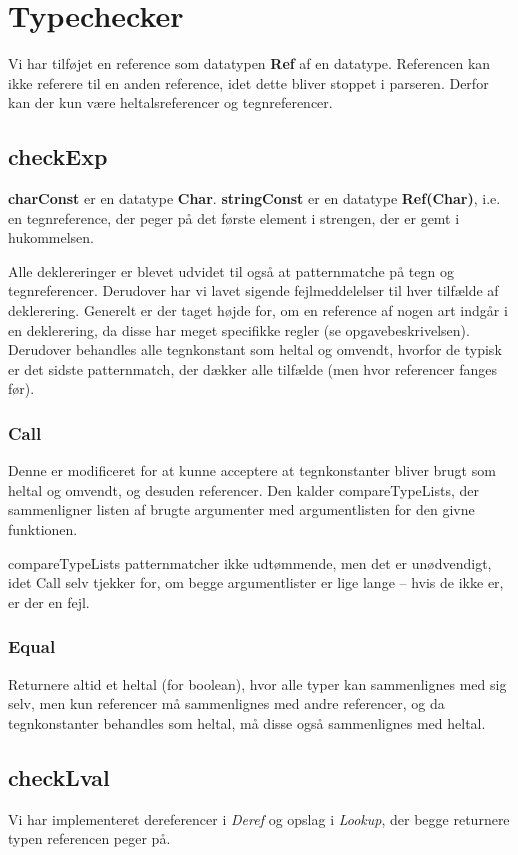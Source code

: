 \documentclass[a4paper, 10pt]{article}
\begin{document}
\section{Typechecker}
Vi har tilføjet en reference som datatypen \textbf{Ref} af en datatype. Referencen kan ikke referere til en anden reference, idet dette bliver stoppet i parseren. Derfor kan der kun være heltalsreferencer og tegnreferencer.

\subsection{checkExp}
\textbf{charConst} er en datatype \textbf{Char}.
\textbf{stringConst} er en datatype \textbf{Ref(Char)}, i.e. en tegnreference, der peger på det første element i strengen, der er gemt i hukommelsen.

Alle deklereringer er blevet udvidet til også at patternmatche på tegn og tegnreferencer. Derudover har vi lavet sigende fejlmeddelelser til hver tilfælde af deklerering. Generelt er der taget højde for, om en reference af nogen art indgår i en deklerering, da disse har meget specifikke regler (se opgavebeskrivelsen). Derudover behandles alle tegnkonstant som heltal og omvendt, hvorfor de typisk er det sidste patternmatch, der dækker alle tilfælde (men hvor referencer fanges før).

\subsubsection{Call}
Denne er modificeret for at kunne acceptere at tegnkonstanter bliver brugt som heltal og omvendt, og desuden referencer.
Den kalder compareTypeLists, der sammenligner listen af brugte argumenter med argumentlisten for den givne funktionen. 

compareTypeLists patternmatcher ikke udtømmende, men det er unødvendigt, idet Call selv tjekker for, om begge argumentlister er lige lange -- hvis de ikke er, er der en fejl.

\subsubsection{Equal}
Returnere altid et heltal (for boolean), hvor alle typer kan sammenlignes med sig selv, men kun referencer må sammenlignes med andre referencer, og da tegnkonstanter behandles som heltal, må disse også sammenlignes med heltal.

\subsection{checkLval}
Vi har implementeret dereferencer i \textit{Deref} og opslag i \textit{Lookup}, der begge returnere typen referencen peger på.
\end{document}
